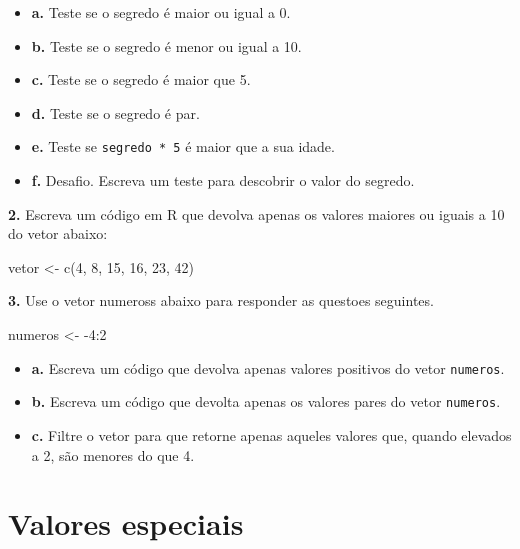 \documentclass[
]{book}
\newenvironment{Shaded}{\begin{snugshade}}{\end{snugshade}}
\newcommand{\DecValTok}[1]{\textcolor[rgb]{0.00,0.00,0.81}{#1}}
\newcommand{\FunctionTok}[1]{\textcolor[rgb]{0.00,0.00,0.00}{#1}}
\newcommand{\NormalTok}[1]{#1}
\newcommand{\OtherTok}[1]{\textcolor[rgb]{0.56,0.35,0.01}{#1}}
\newcommand{\SpecialCharTok}[1]{\textcolor[rgb]{0.00,0.00,0.00}{#1}}
\begin{document}
\begin{itemize}
\item
  \textbf{a.} Teste se o segredo é maior ou igual a 0.
\item
  \textbf{b.} Teste se o segredo é menor ou igual a 10.
\item
  \textbf{c.} Teste se o segredo é maior que 5.
\item
  \textbf{d.} Teste se o segredo é par.
\item
  \textbf{e.} Teste se \texttt{segredo\ *\ 5} é maior que a sua idade.
\item
  \textbf{f.} Desafio. Escreva um teste para descobrir o valor do segredo.
\end{itemize}

\textbf{2.} Escreva um código em R que devolva apenas os valores maiores
ou iguais a 10 do vetor abaixo:

\begin{Shaded}
\begin{Highlighting}[]
\NormalTok{vetor }\OtherTok{\textless{}{-}} \FunctionTok{c}\NormalTok{(}\DecValTok{4}\NormalTok{, }\DecValTok{8}\NormalTok{, }\DecValTok{15}\NormalTok{, }\DecValTok{16}\NormalTok{, }\DecValTok{23}\NormalTok{, }\DecValTok{42}\NormalTok{)}
\end{Highlighting}
\end{Shaded}

\textbf{3.} Use o vetor numeross abaixo para responder as questoes seguintes.

\begin{Shaded}
\begin{Highlighting}[]
\NormalTok{numeros }\OtherTok{\textless{}{-}} \SpecialCharTok{{-}}\DecValTok{4}\SpecialCharTok{:}\DecValTok{2}
\end{Highlighting}
\end{Shaded}

\begin{itemize}
\item
  \textbf{a.} Escreva um código que devolva apenas valores positivos do vetor \texttt{numeros}.
\item
  \textbf{b.} Escreva um código que devolta apenas os valores pares do vetor \texttt{numeros}.
\item
  \textbf{c.} Filtre o vetor para que retorne apenas aqueles valores que, quando elevados a 2, são menores do que 4.
\end{itemize}

\hypertarget{valoresEspeciais}{%
\section{Valores especiais}\label{valoresEspeciais}}
\end{document}
